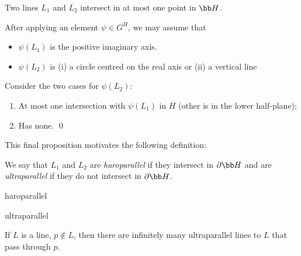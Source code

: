 \begin{proposition}
	Two lines $L_1$ and $L_2$ intersect in at most one point in $\HH$.
\end{proposition}

\begin{proof*}
	[In $H$] After applying an element $\psi\in G^H$, we may assume that
	\begin{itemize}
		\shortskip
		\item $\psi(L_1)$ is the positive imaginary axis.
		\item $\psi(L_2)$ is (i) a circle centred on the real axis or (ii) a vertical line
	\end{itemize}
	Consider the two cases for $\psi(L_2)$:
	\begin{enumerate}
		\shortskip
		\item At most one intersection with $\psi(L_1)$ in $H$ (other is in the lower half-plane);
		\item Has none. \qed
	\end{enumerate}
\end{proof*}

This final proposition motivates the following definition:

\begin{definition}
	We say that $L_1$ and $L_2$ are \emph{haroparallel} if they intersect in $\boundary{\HH}$ and are \emph{ultraparallel} if they do not intersect in $\boundary{\HH}$.

	\begin{center}
		\begin{minipage}{0.4\textwidth} %
		\centering
	\end{minipage}
	\hspace{0.2cm}
		\begin{minipage}{0.4\textwidth}
		\centering
	\end{minipage}

	\begin{minipage}{0.4\textwidth}
		\centering
		haroparallel
	\end{minipage}
	\hspace{0.2cm}
	\begin{minipage}{0.4\textwidth}
		\centering
		ultraparallel
	\end{minipage}
	\end{center}

	If $L$ is a line, $p\not\in L$, then there are infinitely many ultraparallel lines to $L$ that pass through $p$.
\end{definition}

